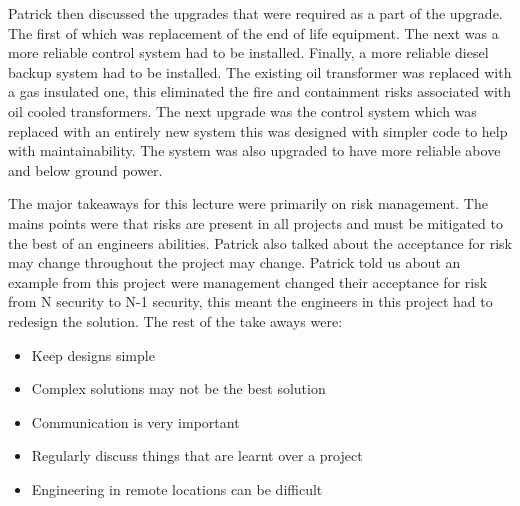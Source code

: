 \documentclass{article}
\begin{document}
Patrick then discussed the upgrades that were required as a part of the upgrade. The first of
which was replacement of the end of life equipment. The next was a more reliable control system 
had to be installed. Finally, a more reliable diesel backup system had to be installed. The
existing oil transformer was replaced with a gas insulated one, this eliminated the fire and
containment risks associated with oil cooled transformers. The next upgrade was the control system
which was replaced with an entirely new system this was designed with simpler code to help with
maintainability. The system was also upgraded to have more reliable above and below ground power.

The major takeaways for this lecture were primarily on risk management. The mains points were that
risks are present in all projects and must be mitigated to the best of an engineers abilities.
Patrick also talked about the acceptance for risk may change throughout the project may change.
Patrick told us about an example from this project were management changed their acceptance for
risk from N security to N-1 security, this meant the engineers in this project had to redesign the
solution. The rest of the take aways were:

\begin{itemize}
    
    \item{Keep designs simple}

    \item{Complex solutions may not be the best solution}

    \item{Communication is very important}

    \item{Regularly discuss things that are learnt over a project}

    \item{Engineering in remote locations can be difficult}

\end{itemize}
\end{document}
